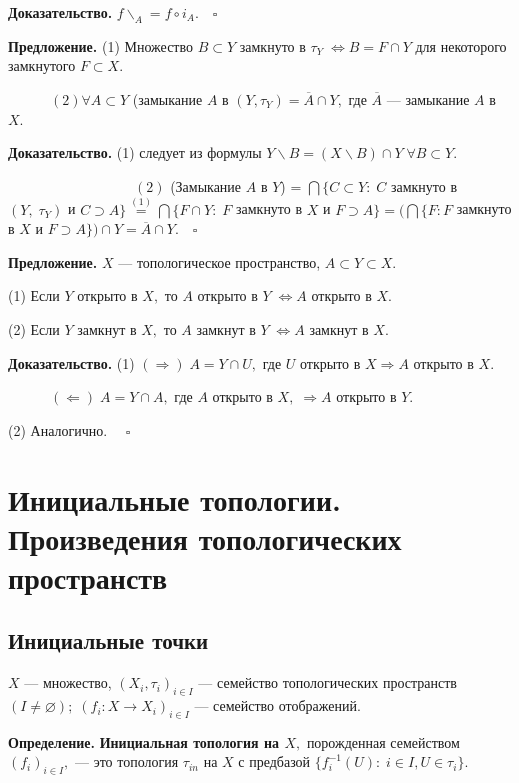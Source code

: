 \documentclass[12pt,a4paper]{article}
\begin{document}
\textbf{Доказательство.} $f\backslash_{A} = f \circ i_{A}. \quad \square$

\textbf{Предложение.} (1) Множество $B \subset Y$ замкнуто в $\tau_{Y} \; \Leftrightarrow B = F \cap Y$ для некоторого замкнутого $F \subset X.$ 

$\quad \quad \quad (2) \forall A \subset Y$ (замыкание $A$ в $(Y, \tau_{Y}) = \overline{A} \cap Y,$ где $\overline{A}$ --- замыкание $A$ в $X.$ 

\textbf{Доказательство.} (1) следует из формулы $Y \backslash B = (X \backslash B) \cap Y \; \forall B \subset Y.$ 

$\quad \quad \quad \quad \quad \quad \quad \quad \quad (2)$ (Замыкание $A$ в $Y$) = $\bigcap\{C \subset Y: \; C$ замкнуто в $(Y, \; \tau_{Y})$ и $C \supset A\} \overset{(1)}{=} \bigcap \{F \cap Y: \; F$ замкнуто в $X$ и $F \supset A\} = (\bigcap \{F: F$ замкнуто в $X$ и $F \supset A\}) \cap Y = \overline{A} \cap Y. \quad \square$ 

\textbf{Предложение.} $X$ --- топологическое пространство, $A \subset Y \subset X.$ 

(1) Если $Y$ открыто в $X,$ то $A$ открыто в $Y \; \Leftrightarrow A$ открыто в $X.$

(2) Если $Y$ замкнут в $X,$ то $A$ замкнут в $Y \; \Leftrightarrow A$ замкнут в $X.$

\textbf{Доказательство.} (1) $(\Rightarrow) \; A = Y \cap U,$ где $U$ открыто в $X \Rightarrow A$ открыто в $X.$

$\quad \quad \quad (\Leftarrow) \; A = Y \cap A,$ где $A$ открыто в $X, \; \Rightarrow A$ открыто в $Y.$ 

(2) Аналогично. $\quad \square$ 

\section{Инициальные топологии. Произведения топологических пространств}

\subsection{Инициальные точки} 

$X$ --- множество, $(X_{i}, \tau_{i})_{i \in I}$ --- семейство топологических пространств $(I \neq \varnothing); \; (f_{i}: X \to X_{i})_{i \in I}$ --- семейство отображений.

\textbf{Определение.} \textbf{Инициальная топология на $X,$} порожденная семейством $(f_{i})_{i \in I},$ --- это топология $\tau_{in}$ на $X$ с предбазой $\{f^{-1}_{i}(U): \; i \in I, U \in \tau_{i}\}.$ 
\end{document}
